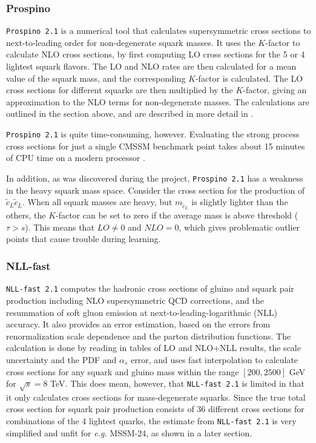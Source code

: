 \documentclass[twoside,english]{uiofysmaster}
\begin{document}
\subsubsection{Prospino}\label{Sec:: susy hadron : Prospino}
\verb|Prospino 2.1| \cite{beenakker1996prospino} is a numerical tool that calculates supersymmetric cross sections to next-to-leading order for non-degenerate squark masses. It uses the $K$-factor to calculate NLO cross sections, by first computing LO cross sections for the 5 or 4 lightest squark flavors. The LO and NLO rates are then calculated for a mean value of the squark mass, and the corresponding $K$-factor is calculated. The LO cross sections for different squarks are then multiplied by the $K$-factor, giving an approximation to the NLO terms for non-degenerate masses. The calculations are outlined in the section above, and are described in more detail in \cite{beenakker1996prospino}. 

\verb|Prospino 2.1| is quite time-consuming, however. Evaluating the strong process cross sections for just a single CMSSM benchmark point takes about 15 minutes of CPU time on a modern processor \cite{balazs2017colliderbit}. 

In addition, as was discovered during the project, \verb|Prospino 2.1| has a weakness in the heavy squark mass space. Consider the cross section for the production of $\tilde{c}_L \tilde{c}_L$. When all squark masses are heavy, but $m_{\tilde{c}_L}$ is slightly lighter than the others, the $K$-factor can be set to zero if the average mass is above threshold ($\tau > s$). This means that $LO \neq 0$ and $NLO =0$, which gives problematic outlier points that cause trouble during learning.



\subsubsection{NLL-fast}

\verb|NLL-fast 2.1| \cite{beenakker1997squark, kulesza2009threshold, kulesza2009soft, beenakker2009soft, beenakker2011squark} computes the hadronic cross sections of gluino and squark pair production including NLO supersymmetric QCD corrections, and the resummation of soft gluon emission at next-to-leading-logarithmic (NLL) accuracy. It also provides an error estimation, based on the errors from renormalization scale dependence and the parton distribution functions. The calculation is done by reading in tables of LO and NLO+NLL results, the scale uncertainty and the PDF and $\alpha_s$ error, and uses fast interpolation to calculate cross sections for any squark and gluino mass within the range $[200, 2500]$ GeV for $\sqrt{s}=8$ TeV. This does mean, however, that \verb|NLL-fast 2.1| is limited in that it only calculates cross sections for mass-degenerate squarks. Since the true total cross section for squark pair production consists of 36 different cross sections for combinations of the 4 lightest quarks, the estimate from \verb|NLL-fast 2.1| is very simplified and unfit for \textit{e.g.} MSSM-24, as shown in a later section.
\end{document}
